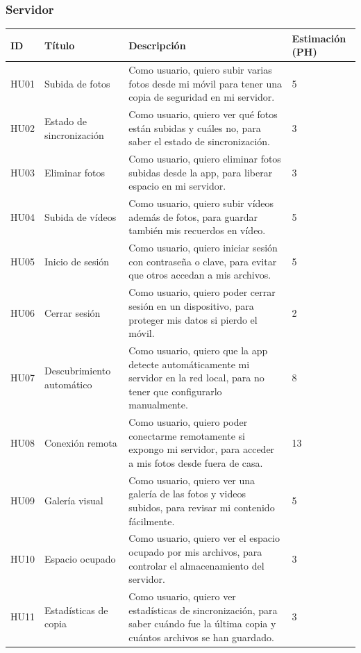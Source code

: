 \subsubsection{Servidor}
\renewcommand{\arraystretch}{1.3} %

\begin{tabularx}{\textwidth}{|l|l|>{\raggedright\arraybackslash}X|p{2cm}|}
    \hline
    \textbf{ID} & \textbf{Título} & \textbf{Descripción} & \textbf{Estimación (PH)} \\
    \hline
    HU01 & Subida de fotos & Como usuario, quiero subir varias fotos desde mi móvil para tener una copia de seguridad en mi servidor. & 5 \\
    \hline
    HU02 & Estado de sincronización & Como usuario, quiero ver qué fotos están subidas y cuáles no, para saber el estado de sincronización. & 3 \\
    \hline
    HU03 & Eliminar fotos & Como usuario, quiero eliminar fotos subidas desde la app, para liberar espacio en mi servidor. & 3 \\
    \hline
    HU04 & Subida de vídeos & Como usuario, quiero subir vídeos además de fotos, para guardar también mis recuerdos en vídeo. & 5 \\
    \hline
    HU05 & Inicio de sesión & Como usuario, quiero iniciar sesión con contraseña o clave, para evitar que otros accedan a mis archivos. & 5 \\
    \hline
    HU06 & Cerrar sesión & Como usuario, quiero poder cerrar sesión en un dispositivo, para proteger mis datos si pierdo el móvil. & 2 \\
    \hline
    HU07 & Descubrimiento automático & Como usuario, quiero que la app detecte automáticamente mi servidor en la red local, para no tener que configurarlo manualmente. & 8 \\
    \hline
    HU08 & Conexión remota & Como usuario, quiero poder conectarme remotamente si expongo mi servidor, para acceder a mis fotos desde fuera de casa. & 13 \\
    \hline
    HU09 & Galería visual & Como usuario, quiero ver una galería de las fotos y videos subidos, para revisar mi contenido fácilmente. & 5 \\
    \hline
    HU10 & Espacio ocupado & Como usuario, quiero ver el espacio ocupado por mis archivos, para controlar el almacenamiento del servidor. & 3 \\
    \hline
    HU11 & Estadísticas de copia & Como usuario, quiero ver estadísticas de sincronización, para saber cuándo fue la última copia y cuántos archivos se han guardado. & 3 \\

\end{tabularx}
